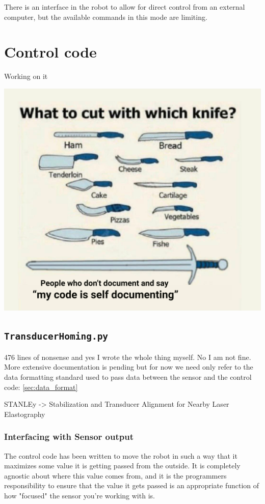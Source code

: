\documentclass[11pt]{article}
\begin{document}
There is an interface in the robot to allow for direct control from an external computer, but the available commands in this mode are limiting.
\section{Control code}\label{sec:control_code}
Working on it
\begin{center}
    \includegraphics[width=.6\linewidth]{figures/control_code_loading_image.png}
\end{center}

\subsection{\texttt{TransducerHoming.py}}\label{sec:TransducerHoming}
476 lines of nonsense and yes I wrote the whole thing myself. No I am not fine. More extensive documentation is pending but for now we need only refer to the data formatting standard used to pass data between the sensor and the control code: \autoref{sec:data_format}

STANLEy -> Stabilization and Transducer Alignment for Nearby Laser Elastography

\subsubsection{Interfacing with Sensor output}\label{sec:data_format}
The control code has been written to move the robot in such a way that it maximizes some value it is getting passed from the outside. It is completely agnostic about where this value comes from, and it is the programmers responsibility to ensure that the value it gets passed is an appropriate function of how "focused" the sensor you're working with is.
\end{document}
